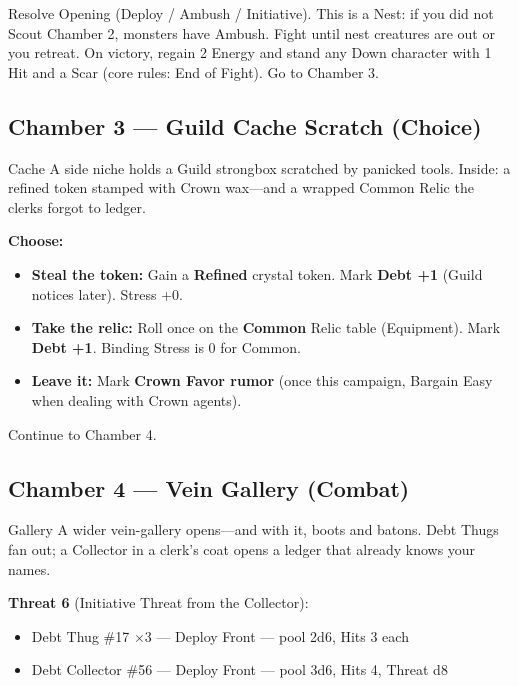 Resolve Opening (Deploy / Ambush / Initiative). This is a Nest: if you did not Scout Chamber 2, monsters have Ambush. Fight until nest creatures are out or you retreat.
On victory, regain 2 Energy and stand any Down character with 1 Hit and a Scar (core rules: End of Fight). Go to Chamber 3.

\subsection{Chamber 3 --- Guild Cache Scratch (Choice)}

\begin{rpgbox}{Cache}
    A side niche holds a Guild strongbox scratched by panicked tools.
    Inside: a refined token stamped with Crown wax---and a wrapped Common Relic the clerks forgot to ledger.
\end{rpgbox}

\textbf{Choose:}
\begin{itemize}
    \item \textbf{Steal the token:} Gain a \textbf{Refined} crystal token. Mark \textbf{Debt +1} (Guild notices later). Stress +0.
    \item \textbf{Take the relic:} Roll once on the \textbf{Common} Relic table (Equipment). Mark \textbf{Debt +1}. Binding Stress is 0 for Common.
    \item \textbf{Leave it:} Mark \textbf{Crown Favor rumor} (once this campaign, Bargain Easy when dealing with Crown agents).
\end{itemize}

Continue to Chamber 4.

\subsection{Chamber 4 --- Vein Gallery (Combat)}

\begin{rpgbox}{Gallery}
    A wider vein-gallery opens---and with it, boots and batons.
    Debt Thugs fan out; a Collector in a clerk's coat opens a ledger that already knows your names.
\end{rpgbox}

\textbf{Threat 6} (Initiative Threat  from the Collector):
\begin{itemize}
    \item Debt Thug \#17 $\times$3 --- Deploy Front --- pool 2d6, Hits 3 each
    \item Debt Collector \#56 --- Deploy Front --- pool 3d6, Hits 4, Threat d8
\end{itemize}

